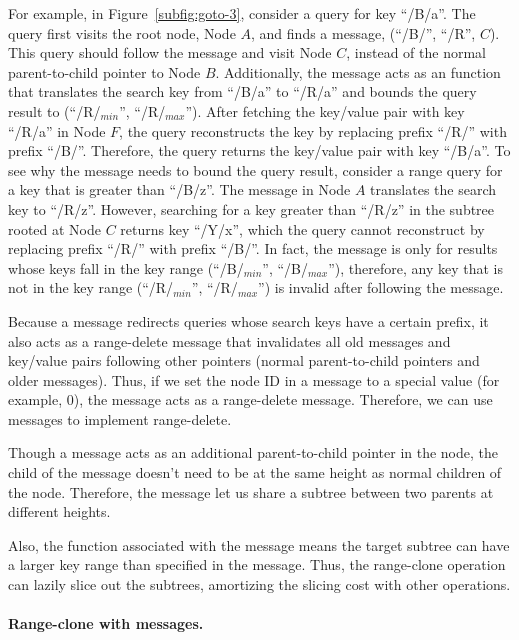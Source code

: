For example, in Figure~\ref{subfig:goto-3}, consider a query for key ``/B/a''.
The query first visits the root node, Node $A$, and finds a \goto message,
\goto(``/B/'', ``/R'', $C$).
This query should follow the \goto message and visit Node $C$,
instead of the normal parent-to-child pointer to Node $B$.
Additionally, the \goto message acts as an \xf function that translates the
search key from ``/B/a'' to ``/R/a'' and bounds the query result to
(``/R/$_{min}$'', ``/R/$_{max}$'').
After fetching the key/value pair with key ``/R/a'' in Node $F$,
the query reconstructs the key by replacing prefix ``/R/'' with prefix ``/B/''.
Therefore, the query returns the key/value pair with key ``/B/a''.
To see why the \goto message needs to bound the query result,
consider a range query for a key that is greater than ``/B/z''.
The \goto message in Node $A$ translates the search key to ``/R/z''.
However, searching for a key greater than ``/R/z'' in the subtree rooted at
Node $C$ returns key ``/Y/x'',
which the query cannot reconstruct by replacing prefix ``/R/'' with prefix
``/B/''.
In fact, the \goto message is only for results whose keys fall in the key
range (``/B/$_{min}$'', ``/B/$_{max}$''),
therefore, any key that is not in the key range
(``/R/$_{min}$'', ``/R/$_{max}$'') is invalid after following the \goto message.

Because a \goto message redirects queries whose search keys have a certain
prefix, it also acts as a range-delete message that invalidates all old messages
and key/value pairs following other pointers (normal parent-to-child pointers
and older \goto messages).
Thus, if we set the node ID in a \goto message to a special value
(for example, 0), the \goto message acts as a range-delete message.
Therefore, we can use \goto messages to implement range-delete.

Though a \goto message acts as an additional parent-to-child pointer in the node,
the child of the \goto message doesn't need to be at the same height as
normal children of the node.
Therefore, the \goto message let us share a subtree between two parents
at different heights.

Also, the \xf function associated with the \goto message means the target
subtree can have a larger key range than specified in the \goto message.
Thus, the range-clone operation can lazily slice out the subtrees,
amortizing the slicing cost with other operations.

\paragraph{Range-clone with \goto messages.}

